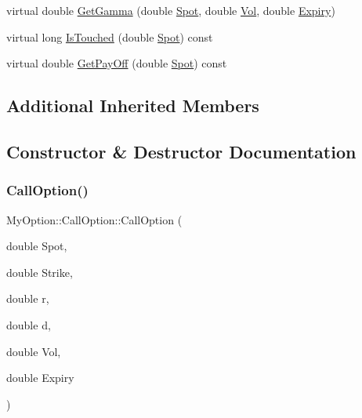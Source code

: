 \begin{DoxyCompactItemize}
virtual double \hyperlink{classMyOption_1_1CallOption_a135259127b922e4ce4db8243c3c52a54}{Get\+Gamma} (double \hyperlink{classMyOption_1_1Option_a6c6f01d75cde7e92d16a6d8d6f331a1d}{Spot}, double \hyperlink{classMyOption_1_1Option_a5d6002c14b335c782873bf1437113513}{Vol}, double \hyperlink{classMyOption_1_1Option_ac1adacb417fede41d151b9cda05bcb3d}{Expiry})
\item 
virtual long \hyperlink{classMyOption_1_1CallOption_a397e70701e8a882e0205193513d27b97}{Is\+Touched} (double \hyperlink{classMyOption_1_1Option_a6c6f01d75cde7e92d16a6d8d6f331a1d}{Spot}) const
\item 
virtual double \hyperlink{classMyOption_1_1CallOption_ad1ee991cfd969e450d7d227dee61be05}{Get\+Pay\+Off} (double \hyperlink{classMyOption_1_1Option_a6c6f01d75cde7e92d16a6d8d6f331a1d}{Spot}) const
\end{DoxyCompactItemize}
\subsection*{Additional Inherited Members}


\subsection{Constructor \& Destructor Documentation}
\hypertarget{classMyOption_1_1CallOption_acca66308420dd80fa525698a77fb53c4}{}\label{classMyOption_1_1CallOption_acca66308420dd80fa525698a77fb53c4} 
\subsubsection{\texorpdfstring{Call\+Option()}{CallOption()}}
{\footnotesize\ttfamily My\+Option\+::\+Call\+Option\+::\+Call\+Option (\begin{DoxyParamCaption}\item[{double}]{Spot,  }\item[{double}]{Strike,  }\item[{double}]{r,  }\item[{double}]{d,  }\item[{double}]{Vol,  }\item[{double}]{Expiry }\end{DoxyParamCaption})}

\hypertarget{classMyOption_1_1CallOption_a1b6b001899368335db393aa8050c9a5c}{}\label{classMyOption_1_1CallOption_a1b6b001899368335db393aa8050c9a5c} 

